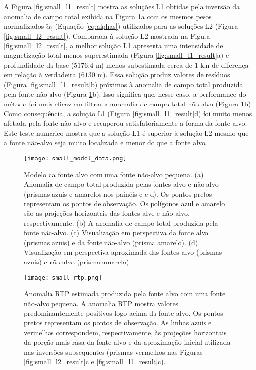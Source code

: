 A Figura \ref{fig:small_l1_result} mostra as soluções L1 obtidas pela inversão da anomalia de campo total exibida na Figura \ref{fig:small_model}a
com os mesmos pesos normalizados $\tilde{\alpha}_{\ell}$ (Equação \ref{eq:alphas})
utilizados para as soluções L2 (Figura \ref{fig:small_l2_result}).
Comparada à solução L2 mostrada na Figura \ref{fig:small_l2_result}, a melhor solução L1 apresenta uma intensidade de magnetização total menos superestimada (Figura 
\ref{fig:small_l1_result}a) e profundidade da base ($5176.4$ m) menos subestimada cerca de $ 1 $ km de diferença em relação à verdadeira ($6130$ m). Essa solução produz valores de resíduos (Figura \ref{fig:small_l1_result}b) 
próximos à anomalia de campo total produzida pela fonte não-alvo (Figura 
\ref{fig:small_model}b). 
Isso significa que, nesse caso, a performance do método foi mais eficaz em filtrar a anomalia de campo total não-alvo (Figura \ref{fig:small_model}b).
Como consequência, a solução L1 (Figura \ref{fig:small_l1_result}d) foi muito menos afetada pela fonte não-alvo e recuperou satisfatoriamente a forma da fonte alvo. 
Este teste numérico mostra que a solução L1 é superior à solução L2 mesmo que a fonte não-alvo seja muito localizada e menor do que a fonte alvo.
\pagebreak
\begin{figure}[!htb]
	\centering
	\texttt{[image: small\_model\_data.png]}
	\caption{Modelo da fonte alvo com uma fonte não-alvo pequena.
		(a) Anomalia de campo total produzida pelas fontes alvo e não-alvo
		(prismas azuis e amarelos nos painéis c e d). Os pontos pretos representam os pontos de observação. Os polígonos azul e amarelo são as projeções horizontais das fontes alvo e não-alvo, respectivamente.
		(b) A anomalia de campo total produzida pela fonte não-alvo. 
		(c) Visualização em perspectiva da fonte alvo (prismas azuis) e da fonte não-alvo (prisma amarelo). 
		(d) Visualização em perspectiva aproximada das fontes alvo (prismas azuis) e não-alvo (prisma amarelo).
	}
	\label{fig:small_model}
\end{figure}
\pagebreak
\begin{figure}[!htb]
	\centering
	\texttt{[image: small\_rtp.png]}
	\caption{Anomalia RTP estimada produzida pela fonte alvo com uma fonte não-alvo pequena. 
		A anomalia RTP mostra valores predominantemente positivos logo acima da fonte alvo. Os pontos pretos representam os pontos de observação. As linhas azuis e vermelhas correspondem, respectivamente, às projeções horizontais da porção mais rasa da fonte alvo e da aproximação inicial utilizada nas inversões subsequentes (prismas vermelhos nas Figuras \ref{fig:small_l2_result}c e 
		\ref{fig:small_l1_result}c).
	}
	\label{fig:small_model_rtp}
\end{figure}
